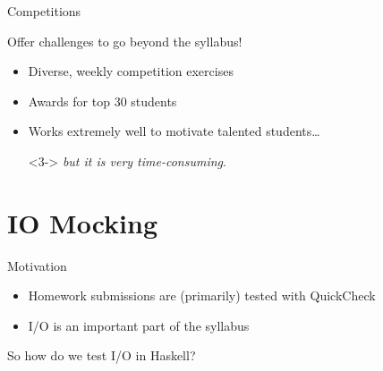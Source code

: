 \documentclass{beamer}
\begin{document}
\begin{frame}[fragile]{Competitions}
\centerline{\Large{\alert{Offer challenges to go beyond the syllabus!}}}
\begin{itemize}
\item Diverse, weekly competition exercises
\item Awards for top 30 students
\item<2-> Works extremely well to motivate talented students\dots
\item[]<3-> \emph{but it is very time-consuming}.
\end{itemize}
\end{frame}


\section{IO Mocking}

\begin{frame}{Motivation}

\begin{itemize}[<+->]
  \item Homework submissions are (primarily) tested with QuickCheck
  \item I/O is an important part of the syllabus
\end{itemize}
\vfill
\pause
\begin{center}
\Large \alert{So how do we test I/O in Haskell?}
\end{center}

\end{frame}
\end{document}
